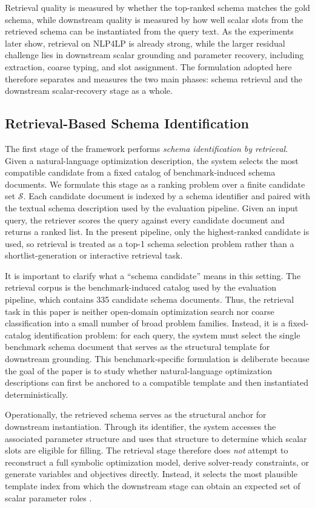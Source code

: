 \documentclass[pdflatex,sn-basic,Numbered]{sn-jnl}
\begin{document}
Retrieval quality is measured by whether the top-ranked schema matches the gold schema, while downstream quality is measured by how well scalar slots from the retrieved schema can be instantiated from the query text. As the experiments later show, retrieval on \textsc{NLP4LP} is already strong, while the larger residual challenge lies in downstream scalar grounding and parameter recovery, including extraction, coarse typing, and slot assignment. The formulation adopted here therefore separates and measures the two main phases: schema retrieval and the downstream scalar-recovery stage as a whole.

\subsection{Retrieval-Based Schema Identification}
\label{subsec:method_retrieval}

The first stage of the framework performs \emph{schema identification by retrieval}. Given a natural-language optimization description, the system selects the most compatible candidate from a fixed catalog of benchmark-induced schema documents. We formulate this stage as a ranking problem over a finite candidate set $\mathcal{S}$. Each candidate document is indexed by a schema identifier and paired with the textual schema description used by the evaluation pipeline. Given an input query, the retriever scores the query against every candidate document and returns a ranked list. In the present pipeline, only the highest-ranked candidate is used, so retrieval is treated as a top-1 schema selection problem rather than a shortlist-generation or interactive retrieval task.

It is important to clarify what a ``schema candidate'' means in this setting. The retrieval corpus is the benchmark-induced catalog used by the evaluation pipeline, which contains 335 candidate schema documents. Thus, the retrieval task in this paper is neither open-domain optimization search nor coarse classification into a small number of broad problem families. Instead, it is a fixed-catalog identification problem: for each query, the system must select the single benchmark schema document that serves as the structural template for downstream grounding. This benchmark-specific formulation is deliberate because the goal of the paper is to study whether natural-language optimization descriptions can first be anchored to a compatible template and then instantiated deterministically.

Operationally, the retrieved schema serves as the structural anchor for downstream instantiation. Through its identifier, the system accesses the associated parameter structure and uses that structure to determine which scalar slots are eligible for filling. The retrieval stage therefore does \emph{not} attempt to reconstruct a full symbolic optimization model, derive solver-ready constraints, or generate variables and objectives directly. Instead, it selects the most plausible template index from which the downstream stage can obtain an expected set of scalar parameter roles \cite{nlp4lp_dataset,ramamonjison2023nl4opt,ahmaditeshnizi2024optimus_icml}.
\end{document}
